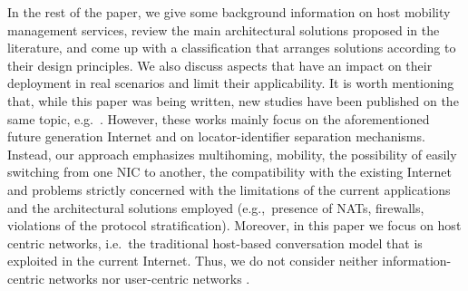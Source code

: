 \documentclass[preprint,12pt]{elsarticle}
\begin{document}
In the rest of the paper, we give some background information on host mobility management services,  review the main architectural solutions proposed in the literature, and come up with a classification that arranges solutions according to their design principles. We also discuss aspects that have an impact on their deployment in real scenarios and limit their applicability. 
It is worth mentioning that, while this paper was being written, new studies have been published on the same topic, e.g.~\cite{survey}. 
However, these works mainly focus on the aforementioned future generation Internet and on locator-identifier separation mechanisms. Instead, our approach emphasizes multihoming, mobility, the possibility of easily switching from one NIC to another, the compatibility with the existing Internet and problems strictly concerned with the limitations of the current applications and the architectural solutions employed (e.g.,~presence of NATs, firewalls, violations of the protocol stratification).
Moreover, in this paper we focus on host centric 
networks, i.e.~the traditional host-based conversation model that is exploited 
in the current Internet. Thus, we do not consider neither information-centric networks 
\cite{icn} nor user-centric networks \cite{tuncer,Wang:2011}. 
\end{document}
